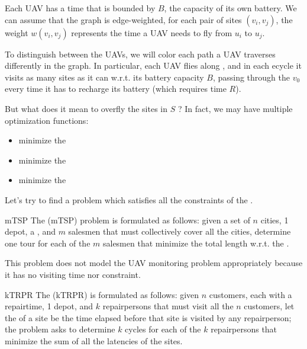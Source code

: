 \documentclass[a4paper, 12pt]{report}
\begin{document}
    Each UAV has a  time that is bounded by $B$, the capacity of its own battery. We can assume that the graph is edge-weighted, for each pair of sites $(v_i,v_j)$, the weight $w(v_i, v_j)$ represents the time a UAV needs to fly from $u_i$ to $u_j$.

    To distinguish between the UAVs, we will color each path a UAV traverses differently in the graph. In particular, each UAV flies along , and in each ecycle it visits as many sites as it can w.r.t. its battery capacity $B$, passing through the  $v_0$ every time it has to recharge its battery (which requires time $R$).

    But what does it mean to overfly the sites in $S$ ? In fact, we may have multiple optimization functions:

    \begin{itemize}
        \item minimize the 
        \item minimize the 
        \item minimize the 
    \end{itemize}

    Let's try to find a problem which satisfies all the constraints of the .

    \begin{frameddefn}{mTSP}
        The  (mTSP) problem is formulated as follows: given a set of $n$ cities, 1 depot, a , and $m$ salesmen that must collectively cover all the cities, determine one tour for each of the $m$ salesmen that minimize the total length w.r.t. the .
    \end{frameddefn}

    This problem does not model the UAV monitoring problem appropriately because it has no visiting time nor  constraint.

    \begin{frameddefn}{kTRPR}
        The  (kTRPR) is formulated as follows: given $n$ customers, each with a repairtime, 1 depot, and $k$ repairpersons that must visit all the $n$ customers, let the  of a site be the time elapsed before that site is visited by any repairperson; the problem asks to determine $k$ cycles for each of the $k$ repairpersons that minimize the sum of all the latencies of the sites.
    \end{frameddefn}
\end{document}
